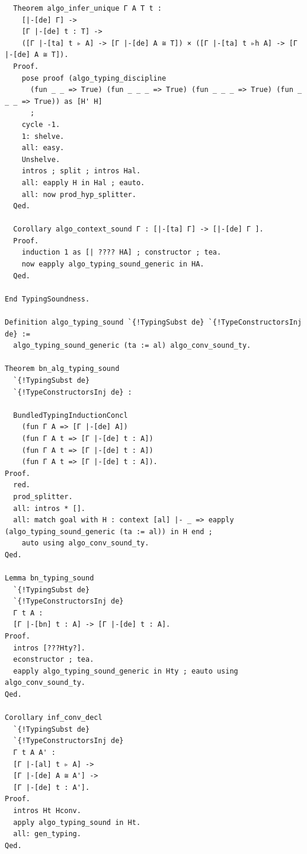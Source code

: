 \documentclass[10pt,a4paper]{amsart}
\begin{document}
\begin{lstlisting}
  Theorem algo_infer_unique Γ A T t :
    [|-[de] Γ] ->
    [Γ |-[de] t : T] ->
    ([Γ |-[ta] t ▹ A] -> [Γ |-[de] A ≅ T]) × ([Γ |-[ta] t ▹h A] -> [Γ |-[de] A ≅ T]).
  Proof.
    pose proof (algo_typing_discipline 
      (fun _ _ => True) (fun _ _ _ => True) (fun _ _ _ => True) (fun _ _ _ => True)) as [H' H] 
      ;
    cycle -1.
    1: shelve.
    all: easy.
    Unshelve.
    intros ; split ; intros Hal.
    all: eapply H in Hal ; eauto.
    all: now prod_hyp_splitter.
  Qed.

  Corollary algo_context_sound Γ : [|-[ta] Γ] -> [|-[de] Γ ].
  Proof.
    induction 1 as [| ???? HA] ; constructor ; tea.
    now eapply algo_typing_sound_generic in HA.
  Qed.

End TypingSoundness.

Definition algo_typing_sound `{!TypingSubst de} `{!TypeConstructorsInj de} :=
  algo_typing_sound_generic (ta := al) algo_conv_sound_ty.

Theorem bn_alg_typing_sound
  `{!TypingSubst de}
  `{!TypeConstructorsInj de} :

  BundledTypingInductionConcl
    (fun Γ A => [Γ |-[de] A])
    (fun Γ A t => [Γ |-[de] t : A])
    (fun Γ A t => [Γ |-[de] t : A])
    (fun Γ A t => [Γ |-[de] t : A]).
Proof.
  red.
  prod_splitter.
  all: intros * [].
  all: match goal with H : context [al] |- _ => eapply (algo_typing_sound_generic (ta := al)) in H end ;
    auto using algo_conv_sound_ty.
Qed.

Lemma bn_typing_sound 
  `{!TypingSubst de}
  `{!TypeConstructorsInj de}
  Γ t A :
  [Γ |-[bn] t : A] -> [Γ |-[de] t : A].
Proof.
  intros [???Hty?].
  econstructor ; tea.
  eapply algo_typing_sound_generic in Hty ; eauto using algo_conv_sound_ty.
Qed.

Corollary inf_conv_decl
  `{!TypingSubst de}
  `{!TypeConstructorsInj de}
  Γ t A A' :
  [Γ |-[al] t ▹ A] ->
  [Γ |-[de] A ≅ A'] ->
  [Γ |-[de] t : A'].
Proof.
  intros Ht Hconv.
  apply algo_typing_sound in Ht.
  all: gen_typing.
Qed.
\end{lstlisting}
\end{document}
